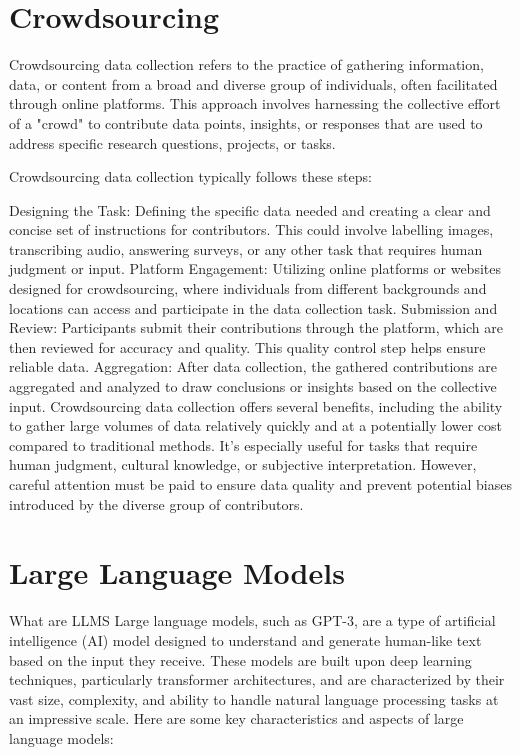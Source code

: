 \section{Crowdsourcing}
Crowdsourcing data collection refers to the practice of gathering information, data, or content from a broad and diverse group of individuals, often facilitated through online platforms. This approach involves harnessing the collective effort of a "crowd" to contribute data points, insights, or responses that are used to address specific research questions, projects, or tasks.

Crowdsourcing data collection typically follows these steps:

Designing the Task: Defining the specific data needed and creating a clear and concise set of instructions for contributors. This could involve labelling images, transcribing audio, answering surveys, or any other task that requires human judgment or input.
Platform Engagement: Utilizing online platforms or websites designed for crowdsourcing, where individuals from different backgrounds and locations can access and participate in the data collection task.
Submission and Review: Participants submit their contributions through the platform, which are then reviewed for accuracy and quality. This quality control step helps ensure reliable data.
Aggregation: After data collection, the gathered contributions are aggregated and analyzed to draw conclusions or insights based on the collective input.
Crowdsourcing data collection offers several benefits, including the ability to gather large volumes of data relatively quickly and at a potentially lower cost compared to traditional methods. It's especially useful for tasks that require human judgment, cultural knowledge, or subjective interpretation. However, careful attention must be paid to ensure data quality and prevent potential biases introduced by the diverse group of contributors.
\section{Large Language Models}
What are LLMS
Large language models, such as GPT-3, are a type of artificial intelligence (AI) model designed to understand and generate human-like text based on the input they receive. These models are built upon deep learning techniques, particularly transformer architectures, and are characterized by their vast size, complexity, and ability to handle natural language processing tasks at an impressive scale. Here are some key characteristics and aspects of large language models:

